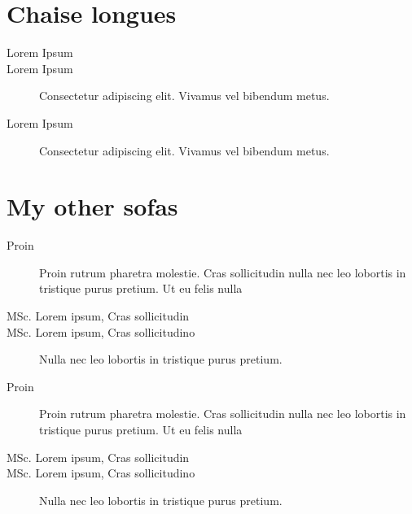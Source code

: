 \documentclass[]{viccuad-cv}
\begin{document}
\section{Chaise longues}
	\begin{description}
		\item[Lorem Ipsum]
		\item[Lorem Ipsum]
			Consectetur adipiscing elit. Vivamus vel bibendum metus.
		\item[Lorem Ipsum]
			Consectetur adipiscing elit. Vivamus vel bibendum metus.
	\end{description}


\section{My other sofas}
	\begin{description}
		\item[Proin]
			Proin rutrum pharetra molestie. Cras sollicitudin nulla nec leo lobortis in tristique purus pretium. Ut eu felis nulla
		\item[MSc. Lorem ipsum, Cras sollicitudin]
        \item[MSc. Lorem ipsum, Cras sollicitudino]
			Nulla nec leo lobortis in tristique purus pretium.
		\item[Proin]
			Proin rutrum pharetra molestie. Cras sollicitudin nulla nec leo lobortis in tristique purus pretium. Ut eu felis nulla
		\item[MSc. Lorem ipsum, Cras sollicitudin]
        \item[MSc. Lorem ipsum, Cras sollicitudino]
			Nulla nec leo lobortis in tristique purus pretium.
	\end{description}
\end{document}
